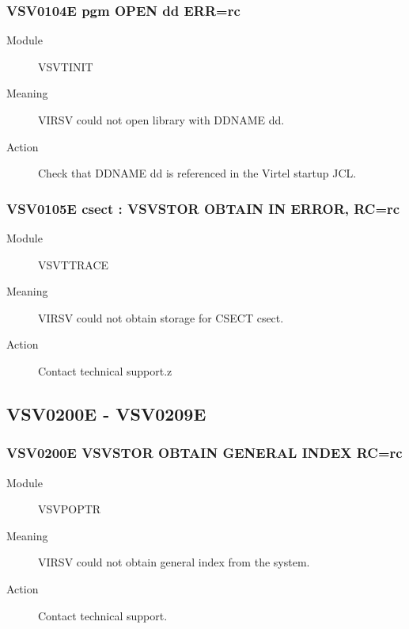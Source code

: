 \documentclass[letterpaper,10pt,english]{sphinxmanual}
\begin{document}
\subsubsection{VSV0104E pgm OPEN dd ERR=rc}
\label{\detokenize{messages:vsv0104e-pgm-open-dd-err-rc}}\begin{description}
\item[{Module}] \leavevmode
VSVTINIT

\item[{Meaning}] \leavevmode
VIRSV could not open library with DDNAME dd.

\item[{Action}] \leavevmode
Check that DDNAME dd is referenced in the Virtel startup JCL.

\end{description}


\subsubsection{VSV0105E csect : VSVSTOR OBTAIN IN ERROR, RC=rc}
\label{\detokenize{messages:vsv0105e-csect-vsvstor-obtain-in-error-rc-rc}}\begin{description}
\item[{Module}] \leavevmode
VSVTTRACE

\item[{Meaning}] \leavevmode
VIRSV could not obtain storage for CSECT csect.

\item[{Action}] \leavevmode
Contact technical support.z

\end{description}


\subsection{VSV0200E - VSV0209E}
\label{\detokenize{messages:vsv0200e-vsv0209e}}

\subsubsection{VSV0200E VSVSTOR OBTAIN GENERAL INDEX RC=rc}
\label{\detokenize{messages:vsv0200e-vsvstor-obtain-general-index-rc-rc}}\begin{description}
\item[{Module}] \leavevmode
VSVPOPTR

\item[{Meaning}] \leavevmode
VIRSV could not obtain general index from the system.

\item[{Action}] \leavevmode
Contact technical support.

\end{description}
\end{document}
